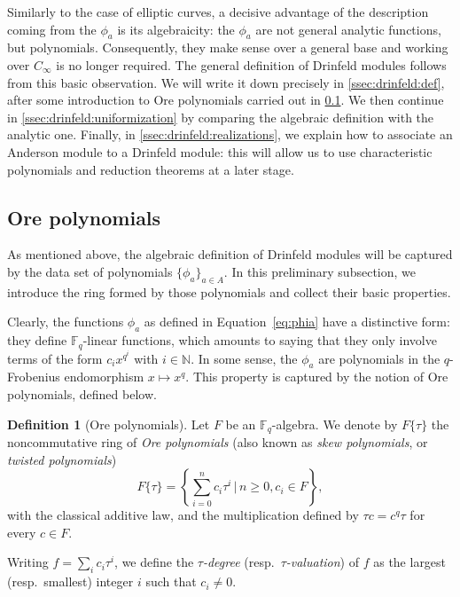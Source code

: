 \documentclass[11pt]{article}
\theoremstyle{definition}
\newtheorem{definition}[theorem]{Definition}
\renewcommand\geq{\geqslant}
\newcommand\N{\mathbb{N}}
\newcommand\Fq{\mathbb{F}_q}
\newcommand{\Cinf}{C_{\infty}}
\begin{document}
Similarly to the case of elliptic curves, a decisive advantage
of the description coming from the $\phi_a$ is its algebraicity: the $\phi_a$ are not general analytic functions, but polynomials.
Consequently, they make sense over a general base and working 
over $\Cinf$ is no longer required.
The general definition of Drinfeld modules follows from this
basic observation. 
We will write it down precisely in \cref{ssec:drinfeld:def}, after some introduction to Ore polynomials carried out
in \cref{ssec:drinfeld:ore}.
We then continue in \cref{ssec:drinfeld:uniformization} by
comparing the algebraic definition with the analytic one. Finally, in \cref{ssec:drinfeld:realizations}, we explain how to associate an Anderson module to a Drinfeld module: this will allow us to use characteristic polynomials and reduction theorems at a later stage.

\subsection{Ore polynomials}
\label{ssec:drinfeld:ore}
As mentioned above, the algebraic definition of Drinfeld modules
will be captured by the data set of polynomials $\{\phi_a\}_{a \in A}$. 
In this preliminary subsection, we introduce the ring formed by those polynomials and collect their basic properties.

\smallskip
Clearly, the functions $\phi_a$ as defined in Equation~\eqref{eq:phia} have
a distinctive form: they define $\Fq$-linear functions, which 
amounts to saying that they only involve terms of the form $c_i x^{q^i}$
with $i \in \N$.
In some sense, the $\phi_a$ are polynomials in the $q$-Frobenius endomorphism $x \mapsto x^q$. 
This property is captured by the notion of Ore polynomials, defined
below.

\begin{definition}[Ore polynomials] \label{def:ore}
Let $F$ be an $\Fq$-algebra.
We denote by $F\{\tau\}$ the noncommutative ring of \emph{Ore polynomials} 
(also known as \emph{skew polynomials}, or \emph{twisted polynomials})
\[F\{\tau\}=\left\{ \sum_{i=0}^n c_i \tau^i \,\Big|\, n \geq 0, c_i \in F\right\},\]
with the classical additive law, and the multiplication defined by $\tau c= c^q \tau$ for every $c \in F$.

Writing $f = \sum_i c_i \tau^i$, we define the \emph{$\tau$-degree} (resp.~\emph{$\tau$-valuation}) of $f$ as the largest (resp.~smallest) integer $i$ such that $c_i \neq 0$.
\end{definition}
\end{document}
